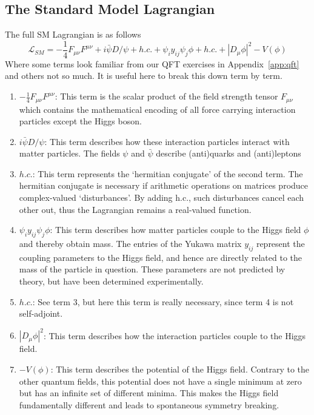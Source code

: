 \subsection{The Standard Model Lagrangian}
The full SM Lagrangian is as follows
\begin{equation}
     \mathcal{L}_{SM} = -\frac{1}{4}F_{\mu\nu}F^{\mu\nu} + i\bar{\psi}{D\!\!\!\!/}\psi  + h.c. +  \psi_{i}y_{ij}\psi_{j}\phi + h.c. + |D_{\mu}\phi|^{2} - V(\phi)
\end{equation}
Where some terms look familiar from our QFT exercises in Appendix~\ref{app:qft} and others not so much.
It is useful here to break this down term by term.
\begin{enumerate}
    \item $-\frac{1}{4}F_{\mu\nu}F^{\mu\nu}$:  This term is the scalar product of the field strength tensor $F_{\mu\nu}$ which contains the mathematical encoding of all force carrying interaction particles except the Higgs boson.
    \item $i\bar{\psi}{D\!\!\!\!/}\psi$: This term describes how these interaction particles interact with matter particles.
    The fields $\psi$ and $\bar{\psi}$ describe (anti)quarks and (anti)leptons
    \item $h.c.$: This term represents the ‘hermitian conjugate’ of the second term.
    The hermitian conjugate is necessary if arithmetic operations on matrices produce complex-valued ‘disturbances’.
    By adding h.c., such disturbances cancel each other out, thus the Lagrangian remains a real-valued function.
    \item $\psi_{i}y_{ij}\psi_{j}\phi $: This term describes how matter particles couple to the Higgs field $\phi$ and thereby obtain mass.
    The entries of the Yukawa matrix $y_{ij}$ represent the coupling parameters to the Higgs field, and hence are directly related to the mass of the particle in question.
    These parameters are not predicted by theory, but have been determined experimentally.
    \item $h.c.$: See term 3, but here this term is really necessary, since term 4 is not self-adjoint.
    \item $|D_{\mu}\phi|^{2}$: This term describes how the interaction particles couple to the Higgs field.
    \item $-V(\phi)$: This term describes the potential of the Higgs field. 
    Contrary to the other quantum fields, this potential does not have a single minimum at zero but has an infinite set of different minima.
    This makes the Higgs field fundamentally different and leads to spontaneous symmetry breaking.
\end{enumerate}

